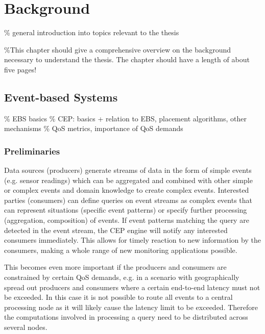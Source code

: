 \chapter{Background}
\% general introduction into topics relevant to the thesis

\%This chapter should give a comprehensive overview on the background necessary to understand the thesis. The chapter should have a length of about five pages!

\section{Event-based Systems}
\% EBS basics
\% CEP: basics + relation to EBS, placement algorithms, other mechanisms
\% QoS metrics, importance of QoS demands  
\subsection{Preliminaries}

Data sources (producers) generate streams of data in the form of simple events (e.g. sensor readings) which can be aggregated and combined with other simple or complex events and domain knowledge to create complex events. 
Interested parties (consumers) can define queries on event streams as complex events that can represent situations (specific event patterns) or specify further processing (aggregation, composition) of events.
If event patterns matching the query are detected in the event stream, the CEP engine will notify any interested consumers immediately.
This allows for timely reaction to new information by the consumers, making a whole range of new monitoring applications possible.

This becomes even more important if the producers and consumers are constrained by certain QoS demands, e.g. in a scenario with geographically spread out producers and consumers where a certain end-to-end latency must not be exceeded. In this case it is not possible to route all events to a central processing node as it will likely cause the latency limit to be exceeded. Therefore the computations involved in processing a query need to be distributed across several nodes.

